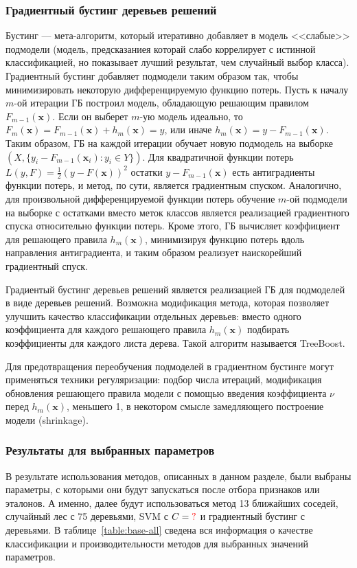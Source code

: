 \subsubsection{Градиентный бустинг деревьев решений}
Бустинг --- мета-алгоритм, который итеративно добавляет в модель <<слабые>> подмодели (модель, предсказаниея которай слабо коррелирует с истинной классификацией, но показывает лучший результат, чем случайный выбор класса). Градиентный бустинг добавляет подмодели таким образом так, чтобы минимизировать некоторую дифференцируемую функцию потерь. Пусть к началу \(m\)-ой итерации ГБ построил модель, обладающую решающим правилом \(F_{m-1}(\mathbf{x})\). Если он выберет \(m\)-ую модель идеально, то \(F_{m}(\mathbf{x})=F_{m-1}(\mathbf{x}) + h_m(\mathbf{x})=y\), или иначе \(h_m(\mathbf{x})=y-F_{m-1}(\mathbf{x})\). Таким образом, ГБ на каждой итерации обучает новую подмодель на выборке \(\left(X, \{y_i-F_{m-1}(\mathbf{x}_i):y_i\in Y\}\right)\). Для квадратичной функции потерь \(L\left(y, F\right)=\frac12 \left(y-F(\mathbf{x})\right)^2\) остатки \(y-F_{m-1}(\mathbf{x})\) есть антиградиенты функции потерь, и метод, по сути, является градиентным спуском. Аналогично, для произвольной дифференцируемой функции потерь обучение \(m\)-ой подмодели на выборке с остатками вместо меток классов является реализацией градиентного спуска относительно функции потерь. Кроме этого, ГБ вычисляет коэффициент для решающего правила \(h_m(\mathbf{x})\), минимизируя функцию потерь вдоль направления антиградиента, и таким образом реализует наискорейший градиентный спуск.

Градиентый бустинг деревьев решений является реализацией ГБ для подмоделей в виде деревьев решений. Возможна модификация метода, которая позволяет улучшить качество классификации отдельных деревьев: вместо одного коэффициента для каждого решающего правила \(h_m(\mathbf{x})\) подбирать коэффициенты для каждого листа дерева. Такой алгоритм называется TreeBoost.

Для предотвращения переобучения подмоделей в градиентном бустинге могут применяться техники регуляризации: подбор числа итераций, модификация обновления решающего правила модели с помощью введения коэффициента \(\nu\) перед \(h_m(\mathbf{x})\), меньшего 1, в некотором смысле замедляющего построение модели (shrinkage).


\subsubsection{Результаты для выбранных параметров}
В результате использования методов, описанных в данном разделе, были выбраны параметры, с которыми они будут запускаться после отбора признаков или эталонов.  А именно, далее будут использоваться метод 13 ближайших соседей, случайный лес с 75 деревьями, SVM с \(C=\textcolor{red}{?}\) и градиентный бустинг с  деревьями. В таблице~\ref{table:base-all} сведена вся информация о качестве классификации и производительности методов для выбранных значений параметров.

